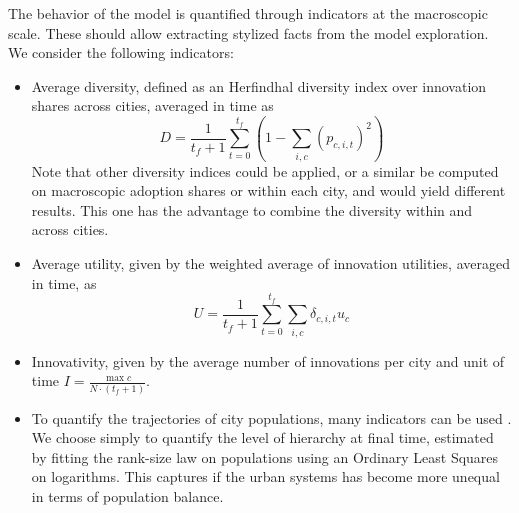 \documentclass[letterpaper]{article}
\begin{document}
The behavior of the model is quantified through indicators at the macroscopic scale. These should allow extracting stylized facts from the model exploration. We consider the following indicators:
\begin{itemize}
	\item Average diversity, defined as an Herfindhal diversity index over innovation shares across cities, averaged in time as
	\begin{equation}
		D = \frac{1}{t_f + 1} \sum_{t=0}^{t_f} \left(1 - \sum_{i,c} \left(p_{c,i,t}\right)^2 \right)	
	\end{equation}
	Note that other diversity indices could be applied, or a similar be computed on macroscopic adoption shares or within each city, and would yield different results. This one has the advantage to combine the diversity within and across cities.
	\item Average utility, given by the weighted average of innovation utilities, averaged in time, as
	\begin{equation}
		U = \frac{1}{t_f + 1} \sum_{t=0}^{t_f} \sum_{i,c} \delta_{c,i,t} u_c 
	\end{equation}
	\item Innovativity, given by the average number of innovations per city and unit of time $I = \frac{\max c}{N\cdot (t_f + 1)}$.
	\item To quantify the trajectories of city populations, many indicators can be used \citep{raimbault2020unveiling}. We choose simply to quantify the level of hierarchy at final time, estimated by fitting the rank-size law on populations using an Ordinary Least Squares on logarithms. This captures if the urban systems has become more unequal in terms of population balance.
\end{itemize}
\end{document}
